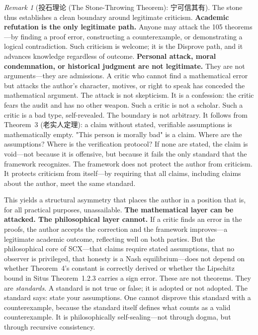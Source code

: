 \documentclass[12pt,a4paper]{ctexart}
\theoremstyle{definition}
\theoremstyle{remark}
\newtheorem{remark}{Remark}[section]
\begin{document}
\begin{remark}[投石理论 (The Stone-Throwing Theorem): 宁可信其有]
The stone thus establishes a clean boundary around legitimate criticism. \textbf{Academic refutation is the only legitimate path.} Anyone may attack the 105 theorems—by finding a proof error, constructing a counterexample, or demonstrating a logical contradiction. Such criticism is welcome; it is the Disprove path, and it advances knowledge regardless of outcome. \textbf{Personal attack, moral condemnation, or historical judgment are not legitimate.} They are not arguments—they are admissions. A critic who cannot find a mathematical error but attacks the author's character, motives, or right to speak has conceded the mathematical argument. The attack is not skepticism. It is a confession: the critic fears the audit and has no other weapon. Such a critic is not a scholar. Such a critic is a bad type, self-revealed. The boundary is not arbitrary. It follows from Theorem~3 (老实人定理): a claim without stated, verifiable assumptions is mathematically empty. "This person is morally bad" is a claim. Where are the assumptions? Where is the verification protocol? If none are stated, the claim is void—not because it is offensive, but because it fails the only standard that the framework recognizes. The framework does not protect the author from criticism. It protects criticism from itself—by requiring that all claims, including claims about the author, meet the same standard.

This yields a structural asymmetry that places the author in a position that is, for all practical purposes, unassailable. \textbf{The mathematical layer can be attacked. The philosophical layer cannot.} If a critic finds an error in the proofs, the author accepts the correction and the framework improves—a legitimate academic outcome, reflecting well on both parties. But the philosophical core of SCX—that claims require stated assumptions, that no observer is privileged, that honesty is a Nash equilibrium—does not depend on whether Theorem~4's constant is correctly derived or whether the Lipschitz bound in Situs Theorem~1.2.3 carries a sign error. These are not theorems. They are \textit{standards}. A standard is not true or false; it is adopted or not adopted. The standard says: state your assumptions. One cannot disprove this standard with a counterexample, because the standard itself defines what counts as a valid counterexample. It is philosophically self-sealing—not through dogma, but through recursive consistency.


\end{remark}
\end{document}
